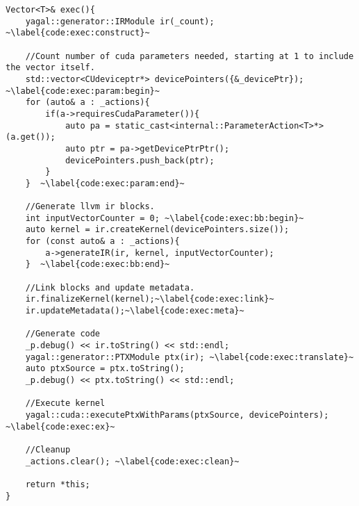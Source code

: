\begin{lstlisting}[caption={The exec function.}, label={code:exec}]
Vector<T>& exec(){
    yagal::generator::IRModule ir(_count); ~\label{code:exec:construct}~

    //Count number of cuda parameters needed, starting at 1 to include the vector itself.
    std::vector<CUdeviceptr*> devicePointers({&_devicePtr}); ~\label{code:exec:param:begin}~
    for (auto& a : _actions){
        if(a->requiresCudaParameter()){
            auto pa = static_cast<internal::ParameterAction<T>*>(a.get());
            auto ptr = pa->getDevicePtrPtr();
            devicePointers.push_back(ptr);
        }
    }  ~\label{code:exec:param:end}~

    //Generate llvm ir blocks.
    int inputVectorCounter = 0; ~\label{code:exec:bb:begin}~
    auto kernel = ir.createKernel(devicePointers.size());
    for (const auto& a : _actions){
        a->generateIR(ir, kernel, inputVectorCounter);
    }  ~\label{code:exec:bb:end}~

    //Link blocks and update metadata.
    ir.finalizeKernel(kernel);~\label{code:exec:link}~
    ir.updateMetadata();~\label{code:exec:meta}~

    //Generate code
    _p.debug() << ir.toString() << std::endl;
    yagal::generator::PTXModule ptx(ir); ~\label{code:exec:translate}~
    auto ptxSource = ptx.toString();
    _p.debug() << ptx.toString() << std::endl;
    
    //Execute kernel
    yagal::cuda::executePtxWithParams(ptxSource, devicePointers);  ~\label{code:exec:ex}~

    //Cleanup
    _actions.clear(); ~\label{code:exec:clean}~

    return *this;
}
\end{lstlisting}

